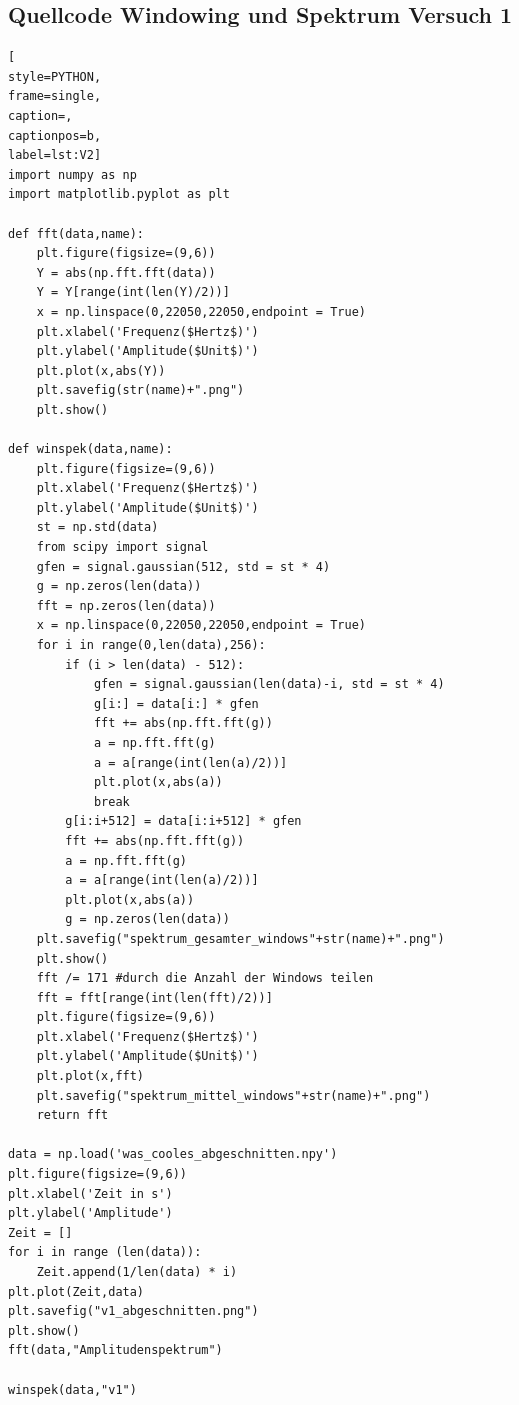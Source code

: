 \documentclass[12pt, oneside, a4paper, \docLanguage]{report}
\begin{document}
\subsection{Quellcode Windowing und Spektrum Versuch 1}
\label{chap:APPENDIX_SOURCECODE_V1}
\begin{lstlisting}[
style=PYTHON,
frame=single,
caption=,
captionpos=b,
label=lst:V2]
import numpy as np
import matplotlib.pyplot as plt

def fft(data,name):
    plt.figure(figsize=(9,6))
    Y = abs(np.fft.fft(data))
    Y = Y[range(int(len(Y)/2))]
    x = np.linspace(0,22050,22050,endpoint = True)
    plt.xlabel('Frequenz($Hertz$)')
    plt.ylabel('Amplitude($Unit$)')
    plt.plot(x,abs(Y))
    plt.savefig(str(name)+".png")
    plt.show()
    
def winspek(data,name):
    plt.figure(figsize=(9,6))
    plt.xlabel('Frequenz($Hertz$)')
    plt.ylabel('Amplitude($Unit$)')
    st = np.std(data)
    from scipy import signal
    gfen = signal.gaussian(512, std = st * 4)
    g = np.zeros(len(data))
    fft = np.zeros(len(data))
    x = np.linspace(0,22050,22050,endpoint = True)
    for i in range(0,len(data),256):
        if (i > len(data) - 512):
            gfen = signal.gaussian(len(data)-i, std = st * 4)
            g[i:] = data[i:] * gfen
            fft += abs(np.fft.fft(g))
            a = np.fft.fft(g)
            a = a[range(int(len(a)/2))]
            plt.plot(x,abs(a))
            break
        g[i:i+512] = data[i:i+512] * gfen
        fft += abs(np.fft.fft(g))
        a = np.fft.fft(g)
        a = a[range(int(len(a)/2))]
        plt.plot(x,abs(a))
        g = np.zeros(len(data))
    plt.savefig("spektrum_gesamter_windows"+str(name)+".png")
    plt.show()
    fft /= 171 #durch die Anzahl der Windows teilen
    fft = fft[range(int(len(fft)/2))]
    plt.figure(figsize=(9,6))
    plt.xlabel('Frequenz($Hertz$)')
    plt.ylabel('Amplitude($Unit$)')
    plt.plot(x,fft)
    plt.savefig("spektrum_mittel_windows"+str(name)+".png")
    return fft
    
data = np.load('was_cooles_abgeschnitten.npy')
plt.figure(figsize=(9,6))
plt.xlabel('Zeit in s')
plt.ylabel('Amplitude')
Zeit = []
for i in range (len(data)):
    Zeit.append(1/len(data) * i)
plt.plot(Zeit,data)
plt.savefig("v1_abgeschnitten.png")
plt.show()
fft(data,"Amplitudenspektrum")

winspek(data,"v1")
\end{lstlisting}
\end{document}
